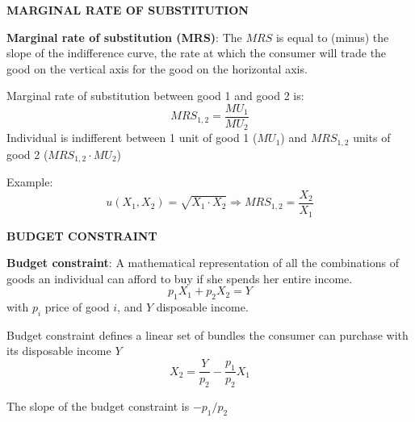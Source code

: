 \documentclass[landscape]{slides}
\begin{document}
%

\begin{slide}
\begin{center}
{\bf MARGINAL RATE OF SUBSTITUTION}
\end{center}

{\bf Marginal rate of substitution (MRS)}:
The $MRS$ is equal to (minus) the slope of the indifference curve, the rate at which the consumer will trade the good on the vertical axis for the good on the horizontal axis.

Marginal rate of substitution between good 1 and good 2 is:
\[ MRS_{1,2} = \frac{MU_1}{MU_2}    \]
Individual is indifferent between 1 unit of good 1 ($MU_1$) and $MRS_{1,2}$ units of good 2 ($MRS_{1,2} \cdot MU_2$)

Example:
\[ u(X_1,X_2) = \sqrt{X_1 \cdot X_2} \Rightarrow MRS_{1,2}= \frac{X_2}{X_1} \]


\end{slide}

\begin{slide}

\end{slide}

\begin{slide}
\begin{center}
{\bf BUDGET CONSTRAINT}
\end{center}

{\bf Budget constraint}:
A mathematical representation of all the combinations of goods an individual can afford to buy if she spends her entire income.
\[ p_1 X_1 + p_2 X_2 = Y\]
with $p_i$ price of good $i$, and $Y$ disposable income.

Budget constraint defines a linear set of bundles the consumer can purchase with its disposable income $Y$
\[ X_2 = \frac{Y}{p_2} - \frac{p_1}{p_2} X_1 \]


The slope of the budget constraint is $-p_1/p_2$


\end{slide}
\end{document}
